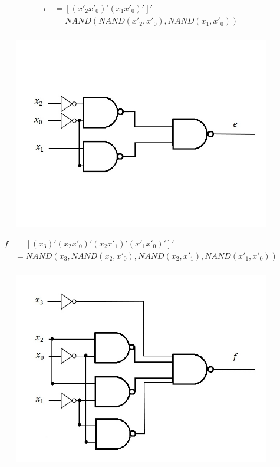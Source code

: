 \documentclass{article}
\begin{document}
\begin{equation*}
\begin{split}
e & = [ (x'_2 x'_0)' (x_1 x'_0)' ]' \\ 
  & = NAND(NAND(x'_2, x'_0), NAND(x_1, x'_0)) \\
\end{split}
\end{equation*}
\begin{figure}[h!]
\centering
\includegraphics[scale=0.25]{e-NAND-NAND}
\end{figure}


\begin{equation*}
\begin{split}
f & = [ (x_3)' (x_2 x'_0)' (x_2 x'_1)' (x'_1 x'_0)' ]' \\ 
  & = NAND(x_3, NAND(x_2, x'_0), NAND(x_2, x'_1), NAND(x'_1, x'_0)) \\
\end{split}
\end{equation*}
\begin{figure}[h!]
\centering
\includegraphics[scale=0.25]{f-NAND-NAND}
\end{figure}
\end{document}
